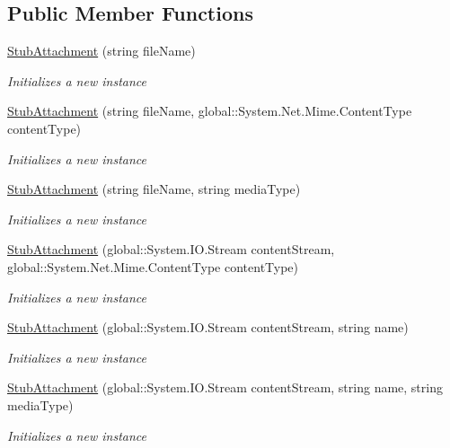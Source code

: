 \subsection*{Public Member Functions}
\begin{DoxyCompactItemize}
\item 
\hyperlink{class_system_1_1_net_1_1_mail_1_1_fakes_1_1_stub_attachment_af32d4b87346d96c196098ccace7e1e01}{Stub\-Attachment} (string file\-Name)
\begin{DoxyCompactList}\small\item\em Initializes a new instance\end{DoxyCompactList}\item 
\hyperlink{class_system_1_1_net_1_1_mail_1_1_fakes_1_1_stub_attachment_a0a67b2479ba1e31512b872a91ba639e7}{Stub\-Attachment} (string file\-Name, global\-::\-System.\-Net.\-Mime.\-Content\-Type content\-Type)
\begin{DoxyCompactList}\small\item\em Initializes a new instance\end{DoxyCompactList}\item 
\hyperlink{class_system_1_1_net_1_1_mail_1_1_fakes_1_1_stub_attachment_a523c082b5388e47074aa95189eb62131}{Stub\-Attachment} (string file\-Name, string media\-Type)
\begin{DoxyCompactList}\small\item\em Initializes a new instance\end{DoxyCompactList}\item 
\hyperlink{class_system_1_1_net_1_1_mail_1_1_fakes_1_1_stub_attachment_a371ac1bfd7b6af3bdc8aa565756643e6}{Stub\-Attachment} (global\-::\-System.\-I\-O.\-Stream content\-Stream, global\-::\-System.\-Net.\-Mime.\-Content\-Type content\-Type)
\begin{DoxyCompactList}\small\item\em Initializes a new instance\end{DoxyCompactList}\item 
\hyperlink{class_system_1_1_net_1_1_mail_1_1_fakes_1_1_stub_attachment_a1f6c8f666a39d2e09541c2542e9f260b}{Stub\-Attachment} (global\-::\-System.\-I\-O.\-Stream content\-Stream, string name)
\begin{DoxyCompactList}\small\item\em Initializes a new instance\end{DoxyCompactList}\item 
\hyperlink{class_system_1_1_net_1_1_mail_1_1_fakes_1_1_stub_attachment_a78872e4c0cdc9e23c33032751ebf86d4}{Stub\-Attachment} (global\-::\-System.\-I\-O.\-Stream content\-Stream, string name, string media\-Type)
\begin{DoxyCompactList}\small\item\em Initializes a new instance\end{DoxyCompactList}\end{DoxyCompactItemize}
